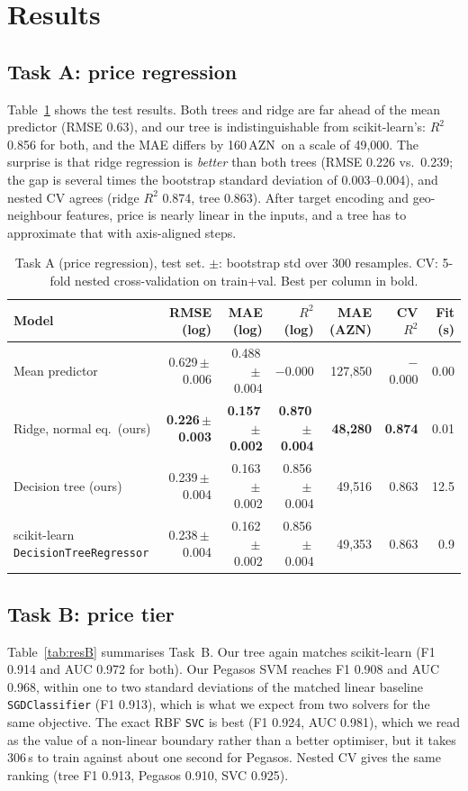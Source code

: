 \documentclass[10pt,twocolumn,a4paper]{article}
\newcommand{\AZN}{\,AZN}
\newcommand{\pmstd}[2]{#1\,{\scriptsize$\pm$\,#2}}
\begin{document}
\section{Results}
\subsection{Task A: price regression}
Table~\ref{tab:resA} shows the test results. Both trees and ridge are far
ahead of the mean predictor (RMSE 0.63), and our tree is indistinguishable
from scikit-learn's: $R^2$ 0.856 for both, and the MAE differs by 160\AZN\
on a scale of 49{,}000. The surprise is that ridge regression is
\emph{better} than both trees (RMSE 0.226 vs.\ 0.239; the gap is several times the
bootstrap standard deviation of 0.003--0.004), and nested CV agrees (ridge $R^2$ 0.874, tree 0.863).
After target encoding and geo-neighbour features, price is nearly linear in the inputs,
and a tree has to approximate that with axis-aligned steps.

\begin{table}[t]
  \centering\small
  \caption{Task A (price regression), test set. $\pm$: bootstrap std over 300 resamples.
    CV: 5-fold nested cross-validation on train+val. Best per column in bold.}
  \label{tab:resA}
  \begin{tabular}{@{}lrrrrrr@{}}
    \toprule
    Model & RMSE (log) & MAE (log) & $R^2$ (log) & MAE (AZN) & CV $R^2$ & Fit (s)\\
    \midrule
    Mean predictor                & \pmstd{0.629}{0.006} & \pmstd{0.488}{0.004} & $-$0.000 & 127{,}850 & $-$0.000 & 0.00\\
    Ridge, normal eq.\ (ours)     & \textbf{\pmstd{0.226}{0.003}} & \textbf{\pmstd{0.157}{0.002}} & \textbf{\pmstd{0.870}{0.004}} & \textbf{48{,}280} & \textbf{0.874} & 0.01\\
    Decision tree (ours)          & \pmstd{0.239}{0.004} & \pmstd{0.163}{0.002} & \pmstd{0.856}{0.004} & 49{,}516 & 0.863 & 12.5\\
    scikit-learn \texttt{DecisionTreeRegressor} & \pmstd{0.238}{0.004} & \pmstd{0.162}{0.002} & \pmstd{0.856}{0.004} & 49{,}353 & 0.863 & 0.9\\
    \bottomrule
  \end{tabular}
\end{table}

\subsection{Task B: price tier}
Table~\ref{tab:resB} summarises Task~B. Our tree again matches
scikit-learn (F1 0.914 and AUC 0.972 for both). Our Pegasos SVM reaches F1 0.908 and AUC
0.968, within one to two standard deviations of the matched linear baseline
\texttt{SGDClassifier} (F1 0.913), which is what we expect from two solvers for
the same objective. The exact RBF \texttt{SVC} is best (F1 0.924,
AUC 0.981), which we read as the value of a non-linear boundary rather than a
better optimiser, but it takes 306\,s to train against about one second for
Pegasos. Nested CV gives the same ranking (tree F1 0.913, Pegasos 0.910, SVC 0.925).
\end{document}
